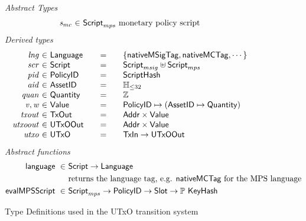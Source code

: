 \begin{figure*}[t!]
  \emph{Abstract Types}
  \begin{equation*}
    \begin{array}{r@{~\in~}l@{~}lr}
      \var{s_{mc}} & \ScriptMPS & \text{monetary policy script}
     \end{array}
  \end{equation*}
  \emph{Derived types}
  \begin{equation*}
    \begin{array}{r@{~\in~}l@{\qquad=\qquad}lr}
      \var{lng} & \Language & \{\mathsf{nativeMSigTag}, \mathsf{nativeMCTag}, \cdots\} \\
      \var{scr} & \Script & \ScriptMSig \uniondistinct \ScriptMPS \\
      \var{pid} & \PolicyID & \ScriptHash \\
      \var{aid} & \AssetID & \mathbb{H}_{\leq 32}\\
      \var{quan} & \Quantity & \Z \\
      \var{v}, \var{w} & \Value
      & \PolicyID \mapsto ( \AssetID \mapsto \Quantity ) \\
      \var{txout}
      & \TxOut
      & \Addr \times \Value
      \\
      \var{utxoout}
      & \UTxOOut
      & \Addr \times \Value \\
      \var{utxo}
      & \UTxO
      & \TxIn \to \UTxOOut
    \end{array}
  \end{equation*}
  \emph{Abstract functions}
  \begin{align*}
    \mathsf{language} ~\in~    & \mathsf{Script} \to \mathsf{Language} \\
                            & \text{returns the language tag, e.g. $\mathsf{nativeMCTag}$ for the MPS language} \\
    \mathsf{evalMPSScript}~\in~& \mathsf{Script}_{mps}\to\mathsf{PolicyID}\to\mathsf{Slot}\to\mathbb{P}~\mathsf{KeyHash} \\
  \end{align*}

  \caption{Type Definitions used in the UTxO transition system}
  \label{fig:defs:utxo-shelley-1}
\end{figure*}

